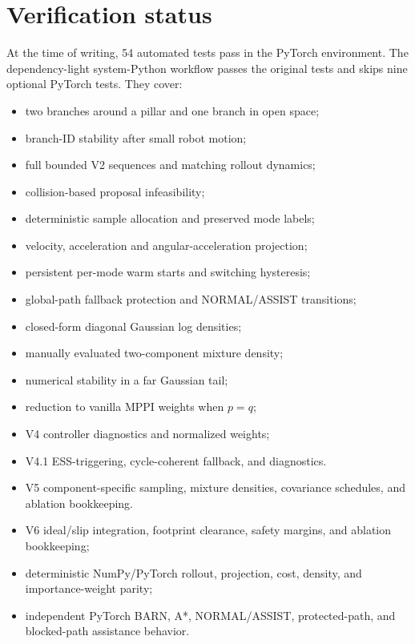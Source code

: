 \documentclass[11pt,a4paper]{article}
\begin{document}
\section{Verification status}

At the time of writing, 54 automated tests pass in the PyTorch environment.
The dependency-light system-Python workflow passes the original tests and
skips nine optional PyTorch tests. They cover:

\begin{itemize}[leftmargin=*]
  \item two branches around a pillar and one branch in open space;
  \item branch-ID stability after small robot motion;
  \item full bounded V2 sequences and matching rollout dynamics;
  \item collision-based proposal infeasibility;
  \item deterministic sample allocation and preserved mode labels;
  \item velocity, acceleration and angular-acceleration projection;
  \item persistent per-mode warm starts and switching hysteresis;
  \item global-path fallback protection and NORMAL/ASSIST transitions;
  \item closed-form diagonal Gaussian log densities;
  \item manually evaluated two-component mixture density;
  \item numerical stability in a far Gaussian tail;
  \item reduction to vanilla MPPI weights when $p=q$;
  \item V4 controller diagnostics and normalized weights;
  \item V4.1 ESS-triggering, cycle-coherent fallback, and diagnostics.
  \item V5 component-specific sampling, mixture densities, covariance
  schedules, and ablation bookkeeping.
  \item V6 ideal/slip integration, footprint clearance, safety margins, and
  ablation bookkeeping;
  \item deterministic NumPy/PyTorch rollout, projection, cost, density, and
  importance-weight parity;
  \item independent PyTorch BARN, A*, NORMAL/ASSIST, protected-path, and
  blocked-path assistance behavior.
\end{itemize}
\end{document}
